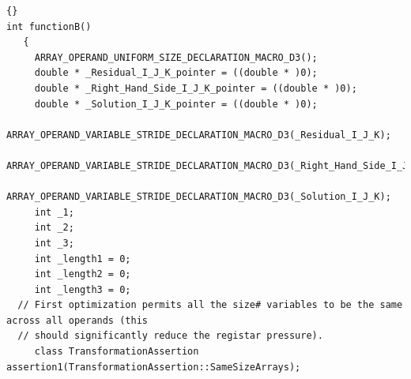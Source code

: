 \documentclass[10pt]{article}
\begin{document}
\begin{lstlisting}{}
int functionB()
   { 
     ARRAY_OPERAND_UNIFORM_SIZE_DECLARATION_MACRO_D3(); 
     double * _Residual_I_J_K_pointer = ((double * )0); 
     double * _Right_Hand_Side_I_J_K_pointer = ((double * )0); 
     double * _Solution_I_J_K_pointer = ((double * )0); 
     ARRAY_OPERAND_VARIABLE_STRIDE_DECLARATION_MACRO_D3(_Residual_I_J_K); 
     ARRAY_OPERAND_VARIABLE_STRIDE_DECLARATION_MACRO_D3(_Right_Hand_Side_I_J_K); 
     ARRAY_OPERAND_VARIABLE_STRIDE_DECLARATION_MACRO_D3(_Solution_I_J_K); 
     int _1; 
     int _2; 
     int _3; 
     int _length1 = 0; 
     int _length2 = 0; 
     int _length3 = 0; 
  // First optimization permits all the size# variables to be the same across all operands (this
  // should significantly reduce the registar pressure).
     class TransformationAssertion assertion1(TransformationAssertion::SameSizeArrays); 


\end{lstlisting}
\end{document}

